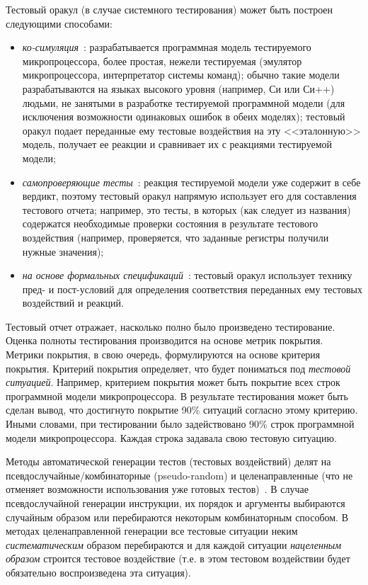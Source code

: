 Тестовый оракул (в случае системного тестирования) может быть построен следующими способами:
\begin{itemize}
  \item \emph{ко-симуляция}~\cite{HoPhD}: разрабатывается программная модель тестируемого микропроцессора, более простая, нежели тестируемая (эмулятор микропроцессора, интерпретатор системы команд); обычно такие модели разрабатываются на языках высокого уровня (например, Си или Си++) людьми, не занятыми в разработке тестируемой программной модели (для исключения возможности одинаковых ошибок в обеих моделях); тестовый оракул подает переданные ему тестовые воздействия на эту <<эталонную>> модель, получает ее реакции и сравнивает их с реакциями тестируемой модели;

  \item \emph{самопроверяющие тесты}~\cite{HoPhD}: реакция тестируемой модели уже содержит в себе вердикт, поэтому тестовый оракул напрямую использует его для составления тестового отчета; например, это тесты, в которых (как следует из названия) содержатся необходимые проверки состояния в результате тестового воздействия (например, проверяется, что заданные регистры получили нужные значения);

  \item \emph{на основе формальных спецификаций}~\cite{KamkinThesis}: тестовый оракул использует технику пред- и пост-условий для определения соответствия переданных ему тестовых воздействий и реакций.
\end{itemize}

Тестовый отчет отражает, насколько полно было произведено тестирование. Оценка полноты тестирования производится на основе метрик покрытия. Метрики покрытия, в свою очередь, формулируются на основе критерия покрытия. Критерий покрытия определяет, что будет пониматься под \emph{тестовой ситуацией}. Например, критерием покрытия может быть покрытие всех строк программной модели микропроцессора. В результате тестирования может быть сделан вывод, что достигнуто покрытие 90\% ситуаций согласно этому критерию. Иными словами, при тестировании было задействовано 90\% строк программной модели микропроцессора. Каждая строка задавала свою тестовую ситуацию.

Методы автоматической генерации тестов (тестовых воздействий) делят на псевдослучайные/комбинаторные (pseudo-random) и целенаправленные (что не отменяет возможности использования уже готовых тестов)~\cite{HoPhD}. В случае псевдослучайной генерации инструкции, их порядок и аргументы выбираются случайным образом или перебираются некоторым комбинаторным способом. В методах целенаправленной генерации все тестовые ситуации неким \emph{систематическим} образом перебираются и для каждой ситуации \emph{нацеленным образом} строится тестовое воздействие (т.е. в этом тестовом воздействии будет обязательно воспроизведена эта ситуация).

